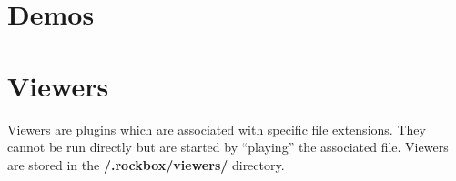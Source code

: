 









\section{Demos}


{}

{}



{}


{}



{}



\section{\label{ref:Viewersplugins}Viewers}

Viewers are plugins which are associated with specific file extensions.
They cannot be run directly but are started by ``playing''
the associated file. Viewers are stored in the
\textbf{/.rockbox/viewers/ }directory.

